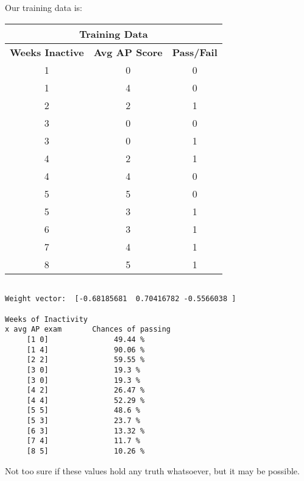 \documentclass{article}
\begin{document}
\newpage

Our training data is:  

\begin{center}
\begin{tabular}{|c|c|c|}
	\hline
	\multicolumn{3}{|c|}{\textbf{Training Data}} \\\hline
	\textbf{Weeks Inactive} & \textbf{Avg AP Score} & \textbf{Pass/Fail} \\\hline
	1 & 0 & 0 \\
	1 & 4 & 0 \\
	2 & 2 & 1\\
	3 & 0 & 0 \\
	3 & 0 & 1 \\
	4 & 2 & 1\\
	4 & 4 & 0\\
	5 & 5 & 0\\
	5 & 3 & 1\\
	6 & 3 & 1\\
	7 & 4 & 1\\
	8 & 5 & 1\\
	\hline
\end{tabular}
\end{center}


\begin{lstlisting}[breaklines=true,basicstyle=\small]

Weight vector:  [-0.68185681  0.70416782 -0.5566038 ]

Weeks of Inactivity
x avg AP exam		Chances of passing
	 [1 0] 				 49.44 %
	 [1 4] 				 90.06 %
	 [2 2] 				 59.55 %
	 [3 0] 				 19.3 %
	 [3 0] 				 19.3 %
	 [4 2] 				 26.47 %
	 [4 4] 				 52.29 %
	 [5 5] 				 48.6 %
	 [5 3] 				 23.7 %
	 [6 3] 				 13.32 %
	 [7 4] 				 11.7 %
	 [8 5] 				 10.26 %
\end{lstlisting}

Not too sure if these values hold any truth whatsoever, but it may be possible.
\end{document}
